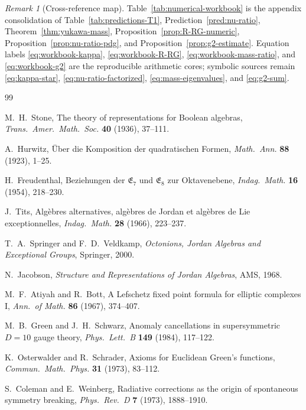 \documentclass[aps,prd,onecolumn,amsmath,amssymb,nofootinbib,11pt]{revtex4-2}
\numberwithin{equation}{section}
\theoremstyle{plain}
\theoremstyle{definition}
\theoremstyle{remark}
\newtheorem{remark}[theorem]{Remark}
\begin{document}
\begin{remark}[Cross-reference map]
Table~\ref{tab:numerical-workbook} is the appendix consolidation of
Table~\ref{tab:predictions-T1}, Prediction~\ref{pred:nu-ratio},
Theorem~\ref{thm:yukawa-mass}, Proposition~\ref{prop:R-RG-numeric},
Proposition~\ref{prop:nu-ratio-pdg}, and Proposition~\ref{prop:g2-estimate}.
Equation labels \eqref{eq:workbook-kappa}, \eqref{eq:workbook-R-RG},
\eqref{eq:workbook-mass-ratio}, and \eqref{eq:workbook-g2} are the reproducible
arithmetic cores; symbolic sources remain \eqref{eq:kappa-star},
\eqref{eq:nu-ratio-factorized}, \eqref{eq:mass-eigenvalues}, and
\eqref{eq:g2-sum}.
\end{remark}%
\begin{thebibliography}{99}

M.~H.~Stone,
The theory of representations for Boolean algebras,
\emph{Trans.\ Amer.\ Math.\ Soc.} \textbf{40} (1936), 37--111.

A.~Hurwitz,
\"Uber die Komposition der quadratischen Formen,
\emph{Math.\ Ann.} \textbf{88} (1923), 1--25.

H.~Freudenthal,
Beziehungen der $\mathfrak{E}_7$ und $\mathfrak{E}_8$ zur Oktavenebene,
\emph{Indag.\ Math.} \textbf{16} (1954), 218--230.

J.~Tits,
Alg\`ebres alternatives, alg\`ebres de Jordan et alg\`ebres de Lie
exceptionnelles,
\emph{Indag.\ Math.} \textbf{28} (1966), 223--237.

T.~A.~Springer and F.~D.~Veldkamp,
\emph{Octonions, Jordan Algebras and Exceptional Groups},
Springer, 2000.

N.~Jacobson,
\emph{Structure and Representations of Jordan Algebras},
AMS, 1968.

M.~F.~Atiyah and R.~Bott,
A Lefschetz fixed point formula for elliptic complexes I,
\emph{Ann.\ of Math.} \textbf{86} (1967), 374--407.

M.~B.~Green and J.~H.~Schwarz,
Anomaly cancellations in supersymmetric $D=10$ gauge theory,
\emph{Phys.\ Lett.\ B} \textbf{149} (1984), 117--122.

K.~Osterwalder and R.~Schrader,
Axioms for Euclidean Green's functions,
\emph{Commun.\ Math.\ Phys.} \textbf{31} (1973), 83--112.

S.~Coleman and E.~Weinberg,
Radiative corrections as the origin of spontaneous symmetry breaking,
\emph{Phys.\ Rev.\ D} \textbf{7} (1973), 1888--1910.


\end{thebibliography}
\end{document}
